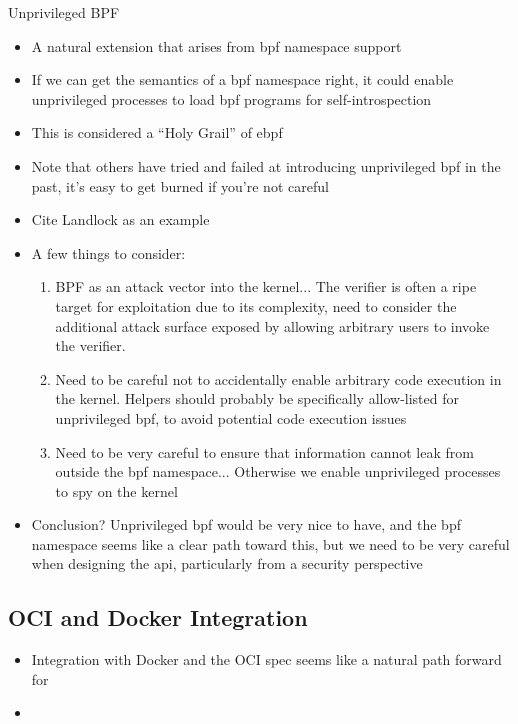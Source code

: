 \begin{inprogress}
  Unprivileged BPF
  \begin{itemize}
    \item A natural extension that arises from \gls{bpf} namespace support
    \item If we can get the semantics of a \gls{bpf} namespace right, it could enable unprivileged processes to load \gls{bpf} programs for self-introspection
    \item This is considered a \enquote{Holy Grail} of \gls{ebpf}
    \item Note that others have tried and failed at introducing unprivileged \gls{bpf} in the past, it's easy to get burned if you're not careful
    \item Cite Landlock as an example
    \item A few things to consider:
    \begin{enumerate}
      \item BPF as an attack vector into the kernel... The verifier is often a ripe target
      for exploitation due to its complexity, need to consider the additional attack
      surface exposed by allowing arbitrary users to invoke the verifier.
      \item Need to be careful not to accidentally enable arbitrary code execution in the
      kernel. Helpers should probably be specifically allow-listed for unprivileged
      \gls{bpf}, to avoid potential code execution issues
      \item Need to be very careful to ensure that information cannot leak from outside
      the \gls{bpf} namespace... Otherwise we enable unprivileged processes to spy on the
      kernel
    \end{enumerate}
    \item Conclusion? Unprivileged \gls{bpf} would be very nice to have, and the \gls{bpf}
    namespace seems like a clear path toward this, but we need to be very careful when
    designing the \gls{api}, particularly from a security perspective
  \end{itemize}
\end{inprogress}

\subsection{OCI and Docker Integration}%
\label{ss:disc-docker-integration}

\begin{inprogress}
  \begin{itemize}
    \item Integration with Docker and the OCI spec seems like a natural path forward for \bpfcontain{}
    \item {}
  \end{itemize}
\end{inprogress}

